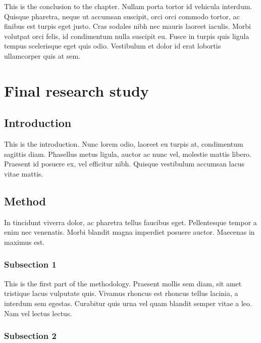 \documentclass[12pt,a4paper,]{report}
\begin{document}
This is the conclusion to the chapter. Nullam porta tortor id vehicula
interdum. Quisque pharetra, neque ut accumsan suscipit, orci orci
commodo tortor, ac finibus est turpis eget justo. Cras sodales nibh nec
mauris laoreet iaculis. Morbi volutpat orci felis, id condimentum nulla
suscipit eu. Fusce in turpis quis ligula tempus scelerisque eget quis
odio. Vestibulum et dolor id erat lobortis ullamcorper quis at sem.

\hypertarget{final-research-study}{%
\chapter{Final research study}\label{final-research-study}}

\hypertarget{introduction-4}{%
\section{Introduction}\label{introduction-4}}

This is the introduction. Nunc lorem odio, laoreet eu turpis at,
condimentum sagittis diam. Phasellus metus ligula, auctor ac nunc vel,
molestie mattis libero. Praesent id posuere ex, vel efficitur nibh.
Quisque vestibulum accumsan lacus vitae mattis.

\hypertarget{method-3}{%
\section{Method}\label{method-3}}

In tincidunt viverra dolor, ac pharetra tellus faucibus eget.
Pellentesque tempor a enim nec venenatis. Morbi blandit magna imperdiet
posuere auctor. Maecenas in maximus est.

\hypertarget{subsection-1-2}{%
\subsection{Subsection 1}\label{subsection-1-2}}

This is the first part of the methodology. Praesent mollis sem diam, sit
amet tristique lacus vulputate quis. Vivamus rhoncus est rhoncus tellus
lacinia, a interdum sem egestas. Curabitur quis urna vel quam blandit
semper vitae a leo. Nam vel lectus lectus.

\hypertarget{subsection-2-3}{%
\subsection{Subsection 2}\label{subsection-2-3}}
\end{document}
